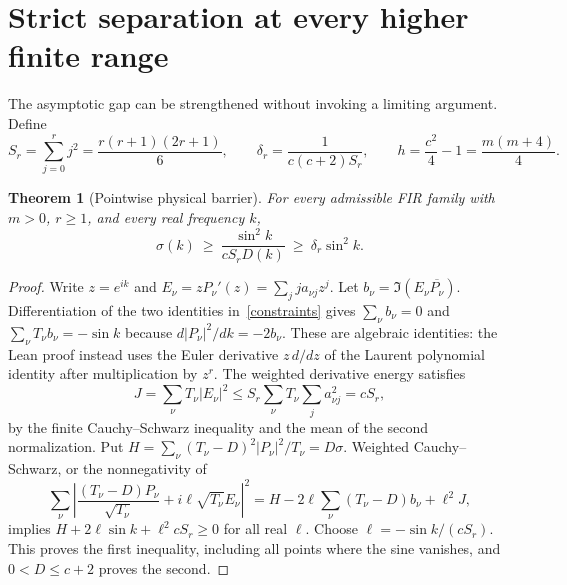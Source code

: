 \documentclass[11pt]{article}
\newtheorem{theorem}{Theorem}
\begin{document}
\section{Strict separation at every higher finite range}\label{finitegap}
The asymptotic gap can be strengthened without invoking a limiting argument. Define
\[
S_r=\sum_{j=0}^{r}j^2=\frac{r(r+1)(2r+1)}{6},\qquad
\delta_r=\frac{1}{c(c+2)S_r},\qquad h=\frac{c^2}{4}-1=\frac{m(m+4)}4.
\]
\begin{theorem}[Pointwise physical barrier]\label{pointwisebarrier}
For every admissible FIR family with $m>0$, $r\ge1$, and every real frequency $k$,
\begin{equation}\label{pointwisegap}
\sigma(k)\ \ge\ \frac{\sin^2 k}{cS_rD(k)}\ \ge\ \delta_r\sin^2 k.
\end{equation}
\end{theorem}
\begin{proof}
Write $z=e^{ik}$ and $E_\nu=zP_\nu'(z)=\sum_j j a_{\nu j}z^j$. Let $b_\nu=\Im(E_\nu\overline{P_\nu})$. Differentiation of the two identities in~\eqref{constraints} gives $\sum_\nu b_\nu=0$ and $\sum_\nu T_\nu b_\nu=-\sin k$ because $d|P_\nu|^2/dk=-2b_\nu$. These are algebraic identities: the Lean proof instead uses the Euler derivative $z\,d/dz$ of the Laurent polynomial identity after multiplication by $z^r$. The weighted derivative energy satisfies
\[
J=\sum_\nu T_\nu |E_\nu|^2
\le S_r\sum_\nu T_\nu\sum_j a_{\nu j}^2=c S_r,
\]
by the finite Cauchy--Schwarz inequality and the mean of the second normalization. Put $H=\sum_\nu (T_\nu-D)^2|P_\nu|^2/T_\nu=D\sigma$. Weighted Cauchy--Schwarz, or the nonnegativity of
\[
\sum_\nu\left|
 \frac{(T_\nu-D)P_\nu}{\sqrt{T_\nu}}
 + i\ell\sqrt{T_\nu}E_\nu
 \right|^2
=H-2\ell\sum_\nu(T_\nu-D)b_\nu+\ell^2J,
\]
implies $H+2\ell\sin k+\ell^2 cS_r\ge0$ for all real $\ell$. Choose $\ell=-\sin k/(cS_r)$. This proves the first inequality, including all points where the sine vanishes, and $0<D\le c+2$ proves the second.
\end{proof}
\end{document}
